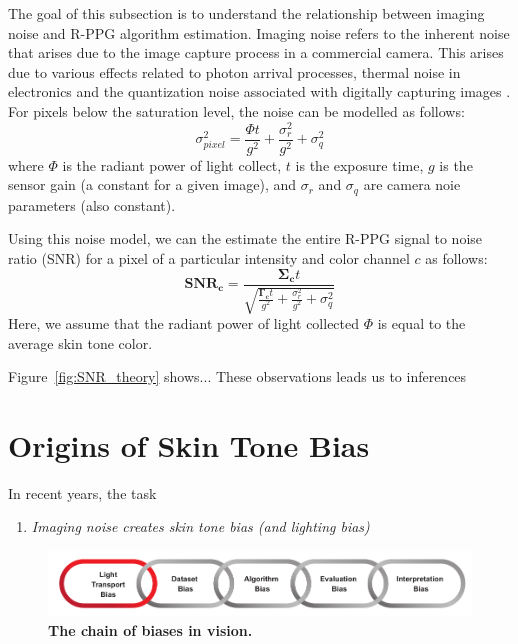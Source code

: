 The goal of this subsection is to understand the relationship between imaging noise and R-PPG algorithm estimation. Imaging noise refers to the inherent noise that arises due to the image capture process in a commercial camera. This arises due to various effects related to photon arrival processes, thermal noise in electronics and the quantization noise associated with digitally capturing images \cite{hasinoff_noise-optimal_2010}. For
pixels below the saturation level, the noise can be modelled as follows: 
\begin{equation} \label{eqn:imaging_noise_model}
    \sigma_{pixel}^2 = \frac{\Phi t}{g^2} + \frac{\sigma_{r}^2}{g^2} + \sigma_{q}^2
\end{equation}
where $\Phi$ is the radiant power of light collect, $t$ is the exposure time, $g$ is the sensor gain (a constant for a given image), and $\sigma_r$ and $\sigma_q$ are camera noie parameters (also constant). 

Using this noise model, we can the estimate the entire R-PPG signal to noise ratio (SNR) for a pixel of a particular intensity and color channel $c$ as follows:
\begin{equation} \label{eqn:SNR_rPPG}
    \mathbf{SNR_c} = \frac{\mathbf{\boldsymbol\Sigma_{c}}t}{\sqrt{\frac{\mathbf{\boldsymbol\Gamma_{c}}t}{g^2} + \frac{\sigma_{r}^2}{g^2} + \sigma_{q}^2}}
\end{equation}
Here, we assume that the radiant power of light collected $\Phi$ is equal to the average skin tone color. 

Figure~\ref{fig:SNR_theory} shows... These observations leads us to inferences

\section{Origins of Skin Tone Bias}

In recent years, the task

\cite{kadambi_achieving_2021}


\begin{enumerate}
    \item \textit{Imaging noise creates skin tone bias (and lighting bias)}

\end{enumerate}

\begin{figure}[t]
    \centering
    \includegraphics[width=\linewidth]{include/F_chain2.pdf}
    \caption{\textbf{The chain of biases in vision.}}
    \label{fig:chain_bias}
\end{figure}


